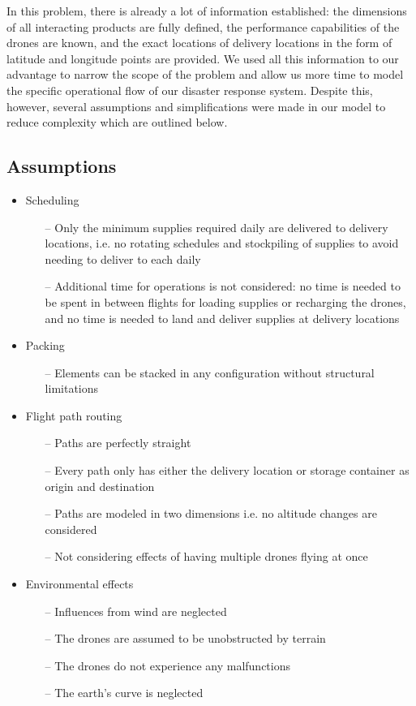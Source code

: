 \documentclass[twocolumn,10pt]{asme2ej}
\begin{document}
In this problem, there is already a lot of information established: the dimensions of all interacting products are fully defined, the performance capabilities of the drones are known, and the exact locations of delivery locations in the form of latitude and longitude points are provided. We used all this information to our advantage to narrow the scope of the problem and allow us more time to model the specific operational flow of our disaster response system. Despite this, however, several assumptions and simplifications were made in our model to reduce complexity which are outlined below.

\subsection{Assumptions}

\begin{itemize}
	\item Scheduling
	\begin{itemize}
		\item[--] Only the minimum supplies required daily are delivered to delivery locations, i.e. no rotating schedules and stockpiling of supplies to avoid needing to deliver to each daily
		\item[--] Additional time for operations is not considered: no time is needed to be spent in between flights for loading supplies or recharging the drones, and no time is needed to land and deliver supplies at delivery locations
	\end{itemize}
    \item Packing
    \begin{itemize}
    	\item[--] Elements can be stacked in any configuration without structural limitations
    \end{itemize}
	\item Flight path routing
	\begin{itemize}
		\item[--] Paths are perfectly straight
		\item[--] Every path only has either the delivery location or storage container as origin and destination
		\item[--] Paths are modeled in two dimensions i.e. no altitude changes are considered
		\item[--] Not considering effects of having multiple drones flying at once
	\end{itemize}
	\item Environmental effects
	\begin{itemize}
		\item[--] Influences from wind are neglected
		\item[--] The drones are assumed to be unobstructed by terrain
		\item[--] The drones do not experience any malfunctions
		\item[--] The earth’s curve is neglected
	\end{itemize}
\end{itemize}
 
\end{document}
